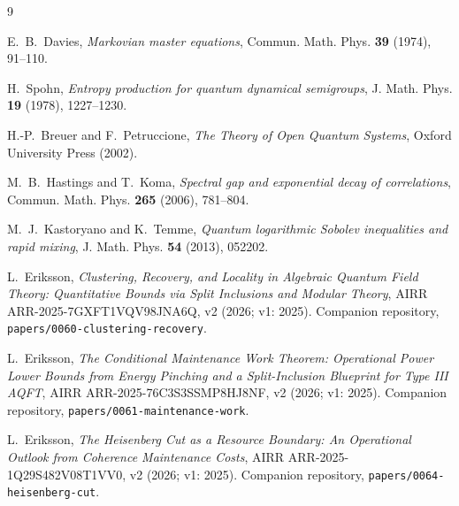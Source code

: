 \documentclass[11pt,a4paper]{article}
\theoremstyle{plain}
\theoremstyle{definition}
\theoremstyle{remark}
\begin{document}
\begin{thebibliography}{9}\small

 E.~B.~Davies, \emph{Markovian master equations}, Commun.
Math. Phys. \textbf{39} (1974), 91--110.

 H.~Spohn, \emph{Entropy production for quantum dynamical
semigroups}, J. Math. Phys. \textbf{19} (1978), 1227--1230.

 H.-P.~Breuer and F.~Petruccione, \emph{The Theory
of Open Quantum Systems}, Oxford University Press (2002).

 M.~B.~Hastings and T.~Koma, \emph{Spectral gap and
exponential decay of correlations}, Commun. Math. Phys. \textbf{265} (2006),
781--804.

 M.~J.~Kastoryano and K.~Temme, \emph{Quantum
logarithmic Sobolev inequalities and rapid mixing}, J. Math. Phys.
\textbf{54} (2013), 052202.

 L.~Eriksson, \emph{Clustering, Recovery, and Locality in
Algebraic Quantum Field Theory: Quantitative Bounds via Split Inclusions and
Modular Theory}, AIRR ARR-2025-7GXFT1VQV98JNA6Q, v2 (2026; v1: 2025). Companion
repository, \texttt{papers/0060-clustering-recovery}.

 L.~Eriksson, \emph{The Conditional Maintenance Work
Theorem: Operational Power Lower Bounds from Energy Pinching and a
Split-Inclusion Blueprint for Type III AQFT}, AIRR ARR-2025-76C3S3SSMP8HJ8NF, v2 (2026;
v1: 2025). Companion repository, \texttt{papers/0061-maintenance-work}.

 L.~Eriksson, \emph{The Heisenberg Cut as a Resource Boundary:
An Operational Outlook from Coherence Maintenance Costs}, AIRR ARR-2025-1Q29S482V08T1VV0,
v2 (2026; v1: 2025). Companion repository,
\texttt{papers/0064-heisenberg-cut}.

\end{thebibliography}
\end{document}
